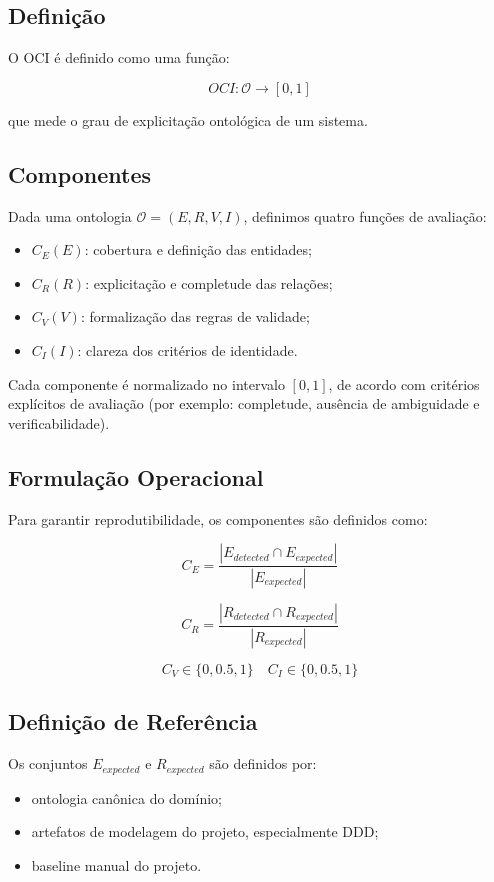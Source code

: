 \documentclass[12pt,a4paper]{article}
\begin{document}
\subsection{Definição}

O OCI é definido como uma função:

\[
OCI : \mathcal{O} \rightarrow [0,1]
\]

que mede o grau de explicitação ontológica de um sistema.

\subsection{Componentes}

Dada uma ontologia \(\mathcal{O} = (E, R, V, I)\), definimos quatro funções de avaliação:

\begin{itemize}
	\item \(C_E(E)\): cobertura e definição das entidades;
	\item \(C_R(R)\): explicitação e completude das relações;
	\item \(C_V(V)\): formalização das regras de validade;
	\item \(C_I(I)\): clareza dos critérios de identidade.
\end{itemize}

Cada componente é normalizado no intervalo \([0,1]\), de acordo com critérios explícitos de avaliação (por exemplo: completude, ausência de ambiguidade e verificabilidade).

\subsection{Formulação Operacional}

Para garantir reprodutibilidade, os componentes são definidos como:

\[
C_E = \frac{|E_{detected} \cap E_{expected}|}{|E_{expected}|}
\]

\[
C_R = \frac{|R_{detected} \cap R_{expected}|}{|R_{expected}|}
\]

\[
C_V \in \{0, 0.5, 1\}
\quad
C_I \in \{0, 0.5, 1\}
\]

\subsection{Definição de Referência}

Os conjuntos \(E_{expected}\) e \(R_{expected}\) são definidos por:

\begin{itemize}
	\item ontologia canônica do domínio;
	\item artefatos de modelagem do projeto, especialmente DDD;
	\item baseline manual do projeto.
\end{itemize}
\end{document}
